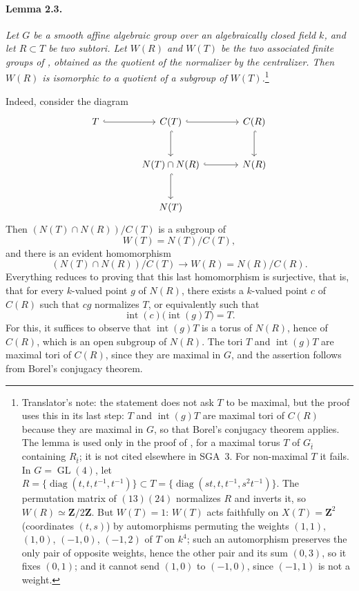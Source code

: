 \paragraph{\textbf{Lemma 2.3.}}
\emph{Let \(G\) be a smooth affine algebraic group over an
algebraically closed field \(k\), and let \(R\subset T\) be two
subtori. Let \(W(R)\) and \(W(T)\) be the two associated finite groups
of , obtained as the quotient of the normalizer by the
centralizer. Then \(W(R)\) is isomorphic to a quotient of a subgroup
of \(W(T)\).}\footnote{Translator's note: the statement does not ask \(T\) to be maximal, but the
proof uses this in its last step: \(T\) and \(\operatorname{int}(g)T\) are maximal tori of \(C(R)\)
because they are maximal in \(G\), so that Borel's conjugacy theorem applies. The lemma is used only
in the proof of , for a maximal torus \(T\) of \(G_{\bar t}\) containing
\(R_{\bar t}\); it is not cited elsewhere in SGA~3. For non-maximal \(T\) it fails. In
\(G=\operatorname{GL}(4)\), let
\(R=\{\operatorname{diag}(t,t,t^{-1},t^{-1})\}\subset
T=\{\operatorname{diag}(st,t,t^{-1},s^2t^{-1})\}\). The permutation matrix of \((13)(24)\)
normalizes \(R\) and inverts it, so \(W(R)\simeq\mathbf Z/2\mathbf Z\). But \(W(T)=1\): \(W(T)\)
acts faithfully on \(X(T)=\mathbf Z^2\) (coordinates \((t,s)\)) by automorphisms permuting the
weights \((1,1)\), \((1,0)\), \((-1,0)\), \((-1,2)\) of \(T\) on \(k^4\); such an automorphism
preserves the only pair of opposite weights, hence the other pair and its sum \((0,3)\), so it fixes
\((0,1)\); and it cannot send \((1,0)\) to \((-1,0)\), since \((-1,1)\) is not a weight.}

Indeed, consider the diagram
\[
\begin{tikzcd}[column sep=large,row sep=large]
T \arrow[r, hook] &
C(T) \arrow[r, hook] \arrow[d, hook] &
C(R) \arrow[d, hook] \\
& N(T)\cap N(R) \arrow[r, hook] \arrow[d, hook] &
N(R) \\
& N(T) &
\end{tikzcd}
\]
Then \((N(T)\cap N(R))/C(T)\) is a subgroup of
\[
  W(T)=N(T)/C(T),
\]
and there is an evident homomorphism
\[
  (N(T)\cap N(R))/C(T)
  \longrightarrow
  W(R)=N(R)/C(R).
\]
Everything reduces to proving that this last homomorphism is
surjective, that is, that for every \(k\)-valued point \(g\) of
\(N(R)\), there exists a \(k\)-valued point \(c\) of \(C(R)\) such
that \(cg\) normalizes \(T\), or equivalently such that
\[
  \operatorname{int}(c)\bigl(\operatorname{int}(g)T\bigr)=T.
\]
For this, it suffices to observe that
\(\operatorname{int}(g)T\) is a torus of \(N(R)\), hence of \(C(R)\),
which is an open subgroup of \(N(R)\). The tori \(T\) and
\(\operatorname{int}(g)T\) are maximal tori of \(C(R)\), since they
are maximal in \(G\), and the assertion follows from Borel's conjugacy
theorem.

